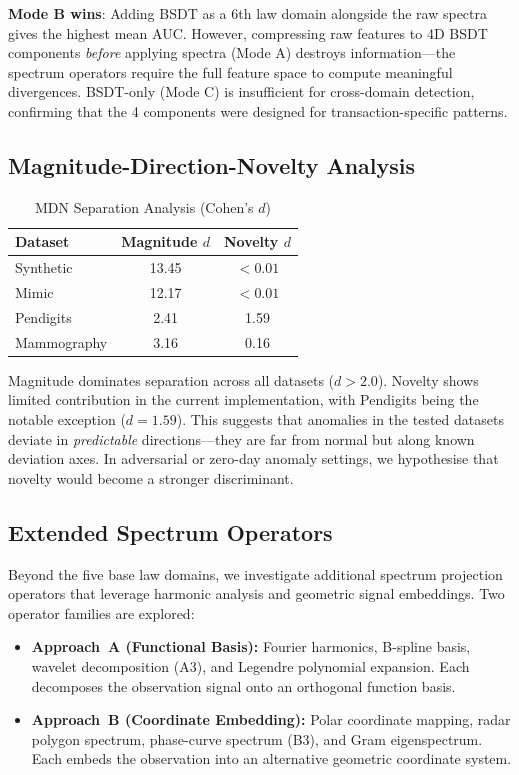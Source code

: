\documentclass[journal]{IEEEtran}
\begin{document}
\textbf{Mode B wins}: Adding BSDT as a 6th law domain alongside the raw spectra gives the highest mean AUC. However, compressing raw features to 4D BSDT components \textit{before} applying spectra (Mode A) destroys information---the spectrum operators require the full feature space to compute meaningful divergences. BSDT-only (Mode C) is insufficient for cross-domain detection, confirming that the 4 components were designed for transaction-specific patterns.

\subsection{Magnitude-Direction-Novelty Analysis}
\label{ssec:mdn_analysis}

\begin{table}[h]
\centering
\caption{MDN Separation Analysis (Cohen's $d$)}
\label{tab:mdn}
\begin{tabular}{@{}lcc@{}}
\toprule
\textbf{Dataset} & \textbf{Magnitude $d$} & \textbf{Novelty $d$} \\
\midrule
Synthetic & 13.45 & $<0.01$ \\
Mimic & 12.17 & $<0.01$ \\
Pendigits & 2.41 & 1.59 \\
Mammography & 3.16 & 0.16 \\
\bottomrule
\end{tabular}
\end{table}

Magnitude dominates separation across all datasets ($d > 2.0$). Novelty shows limited contribution in the current implementation, with Pendigits being the notable exception ($d = 1.59$). This suggests that anomalies in the tested datasets deviate in \textit{predictable} directions---they are far from normal but along known deviation axes. In adversarial or zero-day anomaly settings, we hypothesise that novelty would become a stronger discriminant.

\subsection{Extended Spectrum Operators}
\label{ssec:extended}

Beyond the five base law domains, we investigate additional spectrum projection operators that leverage harmonic analysis and geometric signal embeddings. Two operator families are explored:

\begin{itemize}
  \item \textbf{Approach~A (Functional Basis):} Fourier harmonics, B-spline basis, wavelet decomposition (A3), and Legendre polynomial expansion. Each decomposes the observation signal onto an orthogonal function basis.
  \item \textbf{Approach~B (Coordinate Embedding):} Polar coordinate mapping, radar polygon spectrum, phase-curve spectrum (B3), and Gram eigenspectrum. Each embeds the observation into an alternative geometric coordinate system.
\end{itemize}
\end{document}
